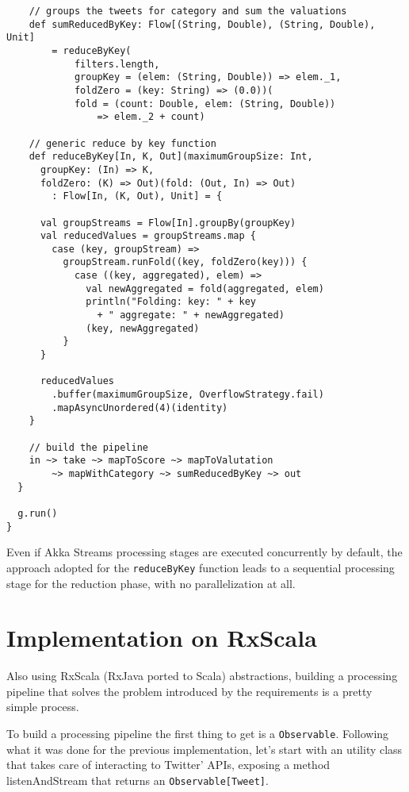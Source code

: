 \begin{verbatim}
    // groups the tweets for category and sum the valuations
    def sumReducedByKey: Flow[(String, Double), (String, Double), Unit]
        = reduceByKey(
            filters.length,
            groupKey = (elem: (String, Double)) => elem._1,
            foldZero = (key: String) => (0.0))(
            fold = (count: Double, elem: (String, Double)) 
            	=> elem._2 + count)

    // generic reduce by key function
    def reduceByKey[In, K, Out](maximumGroupSize: Int,
      groupKey: (In) => K,
      foldZero: (K) => Out)(fold: (Out, In) => Out)
        : Flow[In, (K, Out), Unit] = {

      val groupStreams = Flow[In].groupBy(groupKey)
      val reducedValues = groupStreams.map {
        case (key, groupStream) =>
          groupStream.runFold((key, foldZero(key))) {
            case ((key, aggregated), elem) =>
              val newAggregated = fold(aggregated, elem)
              println("Folding: key: " + key
                + " aggregate: " + newAggregated)
              (key, newAggregated)
          }
      }

      reducedValues
        .buffer(maximumGroupSize, OverflowStrategy.fail)
        .mapAsyncUnordered(4)(identity)
    }

    // build the pipeline
    in ~> take ~> mapToScore ~> mapToValutation
        ~> mapWithCategory ~> sumReducedByKey ~> out
  }

  g.run()
}
\end{verbatim}

Even if Akka Streams processing stages are executed concurrently by
default, the approach adopted for the \texttt{reduceByKey} function
leads to a sequential processing stage for the reduction phase, with no
parallelization at all.

\section{Implementation on RxScala}\label{implementation-on-rxscala}

Also using RxScala (RxJava ported to Scala) abstractions, building a
processing pipeline that solves the problem introduced by the
requirements is a pretty simple process.

To build a processing pipeline the first thing to get is a
\texttt{Observable}. Following what it was done for the previous
implementation, let's start with an utility class that takes care of
interacting to Twitter' APIs, exposing a method listenAndStream that
returns an \texttt{Observable{[}Tweet{]}}.

